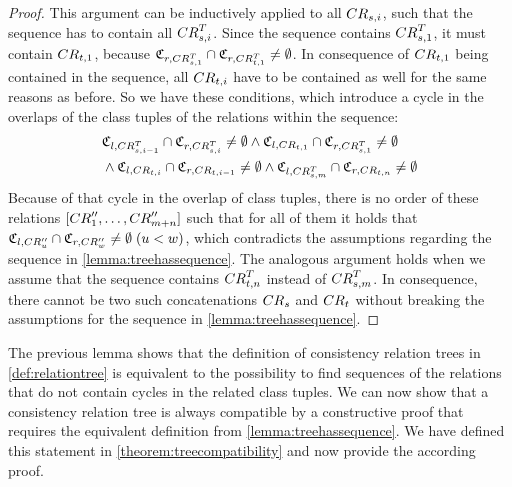 \begin{proof}
    This argument can be inductively applied to all $\consistencyrelation{CR}{s,i}$, such that the sequence has to contain all $\consistencyrelation{CR}{s,i}^T$.
    Since the sequence contains $\consistencyrelation{CR}{s,1}^T$, it must contain $\consistencyrelation{CR}{t,1}$, because $\classtuple{C}{r,\consistencyrelation{CR}{s,1}^T} \cap \classtuple{C}{r,\consistencyrelation{CR}{t,1}^T} \neq \emptyset$.
    In consequence of $\consistencyrelation{CR}{t,1}$ being contained in the sequence, all $\consistencyrelation{CR}{t,i}$ have to be contained as well for the same reasons as before.
    So we have these conditions, which introduce a cycle in the overlaps of the class tuples of the relations within the sequence:
    \begin{align*}
        &
        \classtuple{C}{l,\consistencyrelation{CR}{s,i-1}^T} \cap \classtuple{C}{r,\consistencyrelation{CR}{s,i}^T} \neq \emptyset
        \land
        \classtuple{C}{l,\consistencyrelation{CR}{t,1}} \cap \classtuple{C}{r,\consistencyrelation{CR}{s,1}^T} \neq \emptyset\\
        & 
        \land 
        \classtuple{C}{l,\consistencyrelation{CR}{t,i}} \cap \classtuple{C}{r,\consistencyrelation{CR}{t,i-1}} \neq \emptyset
        \land
        \classtuple{C}{l,\consistencyrelation{CR}{s,m}^T} \cap \classtuple{C}{r,\consistencyrelation{CR}{t,n}} \neq \emptyset
    \end{align*}
    Because of that cycle in the overlap of class tuples, there is no order of these relations $\sequenced{\consistencyrelation{CR}{1}'', \dots, \consistencyrelation{CR}{m+n}''}$ such that for all of them it holds that $\classtuple{C}{l,\consistencyrelation{CR}{u}''} \cap \classtuple{C}{r,\consistencyrelation{CR}{w}''} \neq \emptyset\; (u < w)$, which contradicts the assumptions regarding the sequence in \autoref{lemma:treehassequence}.
    The analogous argument holds when we assume that the sequence contains $\consistencyrelation{CR}{t,n}^T$ instead of $\consistencyrelation{CR}{s,m}^T$.
    In consequence, there cannot be two such concatenations $\consistencyrelation{CR}{s}$ and $\consistencyrelation{CR}{t}$ without breaking the assumptions for the sequence in \autoref{lemma:treehassequence}.
\end{proof}

The previous lemma shows that the definition of consistency relation trees in \autoref{def:relationtree} is equivalent to the possibility to find sequences of the relations that do not contain cycles in the related class tuples.
We can now show that a consistency relation tree is always compatible by a constructive proof that requires the equivalent definition from \autoref{lemma:treehassequence}.
We have defined this statement in \autoref{theorem:treecompatibility} and now provide the according proof.

